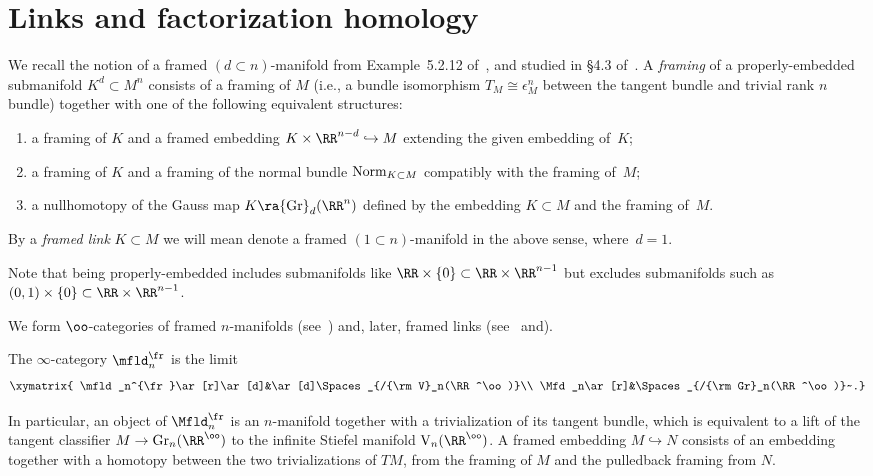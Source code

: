 \documentclass[10pt]{amsart}
\begin{document}
\section{Links and factorization homology}
\label{sec: tangles}

We recall the notion of a framed $(d\subset n)$-manifold from Example~5.2.12 of~\cite{AFT1}, and studied in \S4.3 of~\cite{AFT2}. 
A {\it framing} of a properly-embedded submanifold $K^d\subset M^n$ consists of a framing of $M$ 
(i.e., a bundle isomorphism $T_M\cong \epsilon^n_M$ between the tangent bundle and trivial rank $n$ bundle)
together with one of the following equivalent structures:
\begin{enumerate}
\item a framing of $K$ and a framed embedding $K\times\RR^{n-d}\hookrightarrow M$ extending the given embedding of~$K$;

\item a framing of $K$ and a framing of the normal bundle ${\rm Norm}_{K\subset M}$ compatibly with the framing of~$M$;

\item a nullhomotopy of the Gauss map $K\ra {\rm Gr}_d(\RR^n)$ defined by the embedding $K\subset M$ and the framing of~$M$.

\end{enumerate}
By a {\it framed link} $K\subset M$ we will mean denote a framed $(1\subset n)$-manifold in the above sense, where~$d=1$.

\begin{rmk}
Note that being properly-embedded includes submanifolds like $\RR\times\{0\}\subset \RR \times\RR^{n-1}$ but excludes submanifolds such as $(0,1)\times\{0\}\subset\RR\times\RR^{n-1}$.
\end{rmk}

We form $\oo$-categories of framed $n$-manifolds (see~\cite{AF}) and, later, framed links (see~\cite{AFT1} and\cite{AFT2}).


\begin{dfn}
The $\infty$-category $\mfld_n^{\fr}$ is the limit
\[
\xymatrix{
\mfld_n^{\fr}\ar[r]\ar[d]&\ar[d]\Spaces_{/{\rm V}_n(\RR^\oo)}\\
\Mfd_n\ar[r]&\Spaces_{/{\rm Gr}_n(\RR^\oo)}~.}
\]
\end{dfn}
In particular, an object of $\Mfld_n^\fr$ is an $n$-manifold together with a trivialization of its tangent bundle, which is equivalent to a lift of the tangent classifier $M\to {\rm Gr}_n(\RR^\oo)$ to the infinite Stiefel manifold ${\rm V}_n(\RR^\oo)$. A framed embedding $M\hookrightarrow N$ consists of an embedding together with a homotopy between the two trivializations of $TM$, from the framing of $M$ and the pulledback framing from $N$.
\end{document}
